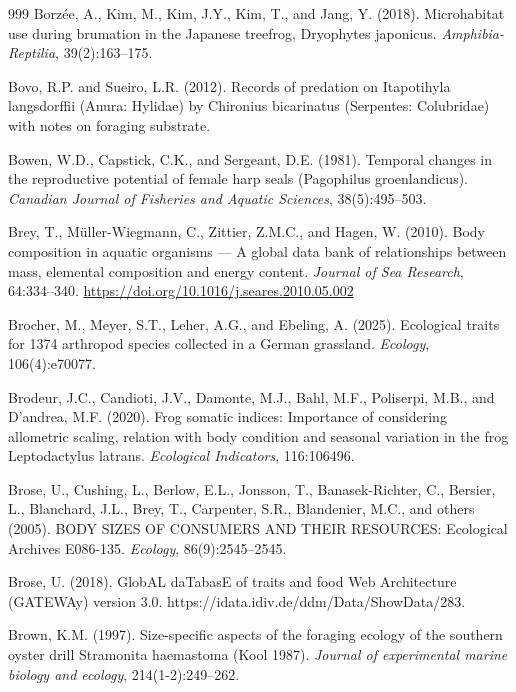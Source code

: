 \begin{thebibliography}{999}
Borz{\'e}e, A., Kim, M., Kim, J.Y., Kim, T., and Jang, Y. (2018). Microhabitat use during brumation in the Japanese treefrog, Dryophytes japonicus. \textit{Amphibia-Reptilia}, 39(2):163--175.

Bovo, R.P. and Sueiro, L.R. (2012). Records of predation on Itapotihyla langsdorffii (Anura: Hylidae) by Chironius bicarinatus (Serpentes: Colubridae) with notes on foraging substrate.

Bowen, W.D., Capstick, C.K., and Sergeant, D.E. (1981). Temporal changes in the reproductive potential of female harp seals (Pagophilus groenlandicus). \textit{Canadian Journal of Fisheries and Aquatic Sciences}, 38(5):495--503.

Brey, T., M{\"u}ller-Wiegmann, C., Zittier, Z.M.C., and Hagen, W. (2010). Body composition in aquatic organisms --- A global data bank of relationships between mass, elemental composition and energy content. \textit{Journal of Sea Research}, 64:334--340. \url{https://doi.org/10.1016/j.seares.2010.05.002}

Brocher, M., Meyer, S.T., Leher, A.G., and Ebeling, A. (2025). Ecological traits for 1374 arthropod species collected in a German grassland. \textit{Ecology}, 106(4):e70077.

Brodeur, J.C., Candioti, J.V., Damonte, M.J., Bahl, M.F., Poliserpi, M.B., and D'andrea, M.F. (2020). Frog somatic indices: Importance of considering allometric scaling, relation with body condition and seasonal variation in the frog Leptodactylus latrans. \textit{Ecological Indicators}, 116:106496.

Brose, U., Cushing, L., Berlow, E.L., Jonsson, T., Banasek-Richter, C., Bersier, L., Blanchard, J.L., Brey, T., Carpenter, S.R., Blandenier, M.C., and others (2005). BODY SIZES OF CONSUMERS AND THEIR RESOURCES: Ecological Archives E086-135. \textit{Ecology}, 86(9):2545--2545.

Brose, U. (2018). {G}lob{AL} da{T}abas{E} of traits and food {W}eb {A}rchitecture ({GATEWA}y) version 3.0. https://idata.idiv.de/ddm/Data/ShowData/283.

Brown, K.M. (1997). Size-specific aspects of the foraging ecology of the southern oyster drill Stramonita haemastoma (Kool 1987). \textit{Journal of experimental marine biology and ecology}, 214(1-2):249--262.


\end{thebibliography}
